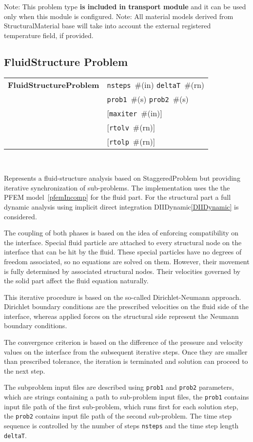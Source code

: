 \documentclass[a4paper]{report}
\newcommand{\param}[1]{\texttt{#1}} %
\newcommand{\optional}[1]{[#1]} %
\newcommand{\field}[2]{\param{#1}~\#{\tiny(#2)}} %
\newcommand{\optField}[2]{\optional{\field{#1}{#2}}}
\newcommand{\entKeywordInst}[1]{\textbf{#1}} %
\newenvironment{record}[1][]{\begin{tabular}{|ll}}{\end{tabular}\\}
\newcommand{\recentry}[2]{{#1}&{#2}\\}
\newcounter{rcc}
\newenvironment{record}[1][\textwidth]{\setcounter{rcc}{0}\rowcolors{1}{lightgray}{lightgray}\tabularx{#1}{llR} \hline}
               {\endtabularx}
\newcommand{\recentry}[2]{\ifthenelse{\value{rcc}>0}{$\backslash$ \\}{\setcounter{rcc}{1}}{#1}&{#2}&}
\begin{document}
Note: This problem type \textbf{is included in transport module} and it
can be used only when this module is configured.
Note: All material models derived from StructuralMaterial base will
take into account the external registered temperature field, if
provided.

\subsection{FluidStructure Problem}
\label{fluidstructureproblem}
\begin{record}
  \recentry{\entKeywordInst{FluidStructureProblem}}{\field{nsteps}{in} \field{deltaT}{rn}}
  \recentry{}{\field{prob1}{s} \field{prob2}{s}}
  \recentry{}{\optField{maxiter}{in}}
  \recentry{}{\optField{rtolv}{rn}}
  \recentry{}{\optField{rtolp}{rn}}
\end{record}

Represents a fluid-structure analysis based on StaggeredProblem but providing
iterative synchronization of sub-problems. The implementation uses the the PFEM
model~\ref{pfemIncomp} for the fluid part. For the structural part a full dynamic
analysis using implicit direct integration DIIDynamic\ref{DIIDynamic} is considered.

The coupling of both phases is based on the idea of enforcing compatibility on the 
interface. Special fluid particle are attached to every structural node on the 
interface that can be hit by the fluid. These special particles have no degrees of 
freedom associated, so no equations are solved on them. However, their movement is 
fully determined by associated structural nodes. Their velocities governed by the 
solid part affect the fluid equation naturally.

This iterative procedure is based on the so-called Dirichlet-Neumann approach.
Dirichlet boundary conditions are the prescribed velocities on the fluid side of
the interface, whereas applied forces on the structural side represent the Neumann
boundary conditions.

The convergence criterion is based on the difference of the pressure and velocity
values on the interface from the subsequent iterative steps. Once they are smaller
than prescribed tolerance, the iteration is terminated and solution can proceed to
the next step.

The subproblem input files are described using
\param{prob1} and \param{prob2} parameters, which are strings
containing a path to sub-problem input files, the \param{prob1}
contains input file path of the first sub-problem, which runs first
for each solution step, the \param{prob2} contains input file path of
the second sub-problem. The time step sequence is controlled by the number of steps
\param{nsteps} and the time step length \param{deltaT}.
\end{document}
